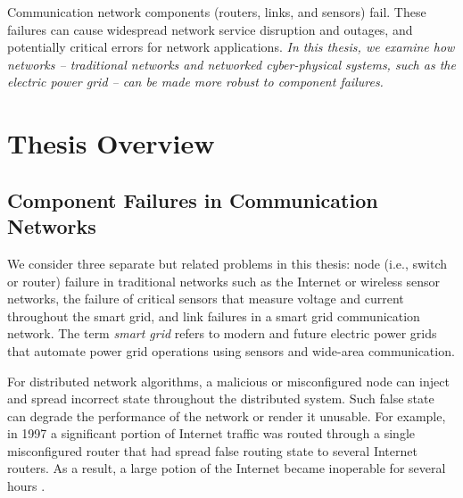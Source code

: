
Communication network components (routers, links, and sensors) fail. %
These failures can cause widespread network service disruption and outages, and potentially critical errors for network applications.
\textit{In this thesis, we examine how networks -- traditional networks and networked cyber-physical systems, such as the electric power grid -- can be made more robust to component failures.}





\section{Thesis Overview}

\subsection{Component Failures in Communication Networks}

We consider three separate but related problems in this thesis: node (i.e., switch or router) failure in traditional networks such as the Internet or wireless sensor networks,
the failure of critical sensors that measure voltage and current throughout the smart grid, and link failures in a smart grid communication network.  The term \emph{smart grid} refers to 
modern and future electric power grids that automate power grid operations using sensors and wide-area communication.

For distributed network algorithms, a malicious or misconfigured node can inject and spread incorrect state throughout the distributed system. 
Such false state can degrade the performance of the network or render it unusable. For example, in 1997 a significant portion of Internet traffic was routed through a 
single misconfigured router that had spread false routing state to several Internet routers.  As a result, a large potion of the Internet became inoperable for several hours \cite{Neumann97}. 


